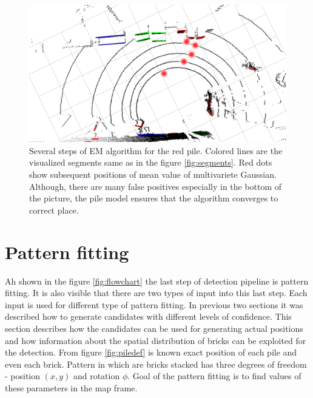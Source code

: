\begin{figure}[H]
\centering
\includegraphics[scale=0.3]{fig/em_algo.png}
\caption[Em Algorithm in pile detector]{Several steps of EM algorithm for the red pile. Colored lines are the visualized segments same as in the figure \ref{fig:segments}. Red dots show subsequent positions of mean value of multivariete Gaussian. Although, there are many false positives especially in the bottom of the picture, the pile model ensures that the algorithm converges to correct place.}
\label{fig:em}
\end{figure}


\section{Pattern fitting}
Ah shown in the figure \ref{fig:flowchart} the last step of detection pipeline is pattern fitting. It is also visible that there are two types of input into this last step. Each input is used for different type of pattern fitting. In previous two sections it was described how to generate candidates with different levels of confidence. This section describes how the candidates can be used for generating actual positions and how information about the spatial distribution of bricks can be exploited for the detection. From figure \ref{fig:piledef} is known exact position of each pile and even each brick. Pattern in which are bricks stacked has three degrees of freedom - position $(x, y)$ and rotation $\phi$. Goal of the pattern fitting is to find values of these parameters in the map frame.

